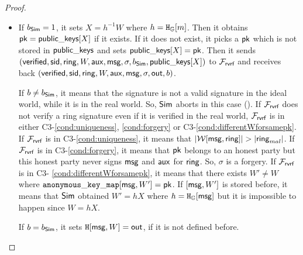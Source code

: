 \begin{proof}
\begin{itemize}
		\begin{itemize}
			\item 		If $ b_{\mathsf{Sim}} = 1 $, it sets $ X = h^{-1} W$ where $ h = \mathtt{H_{\mathbb{G}}}[m] $. Then it obtains $ \mathsf{pk}  = {\mathsf{public\_keys}}[X]$ if it exists. If it does not exist, it picks a $ \mathsf{pk}  $ which is not stored in $ {\mathsf{public\_keys}} $ and sets $ {\mathsf{public\_keys}}[X] = \mathsf{pk} $. Then it sends  $ (\mathsf{verified}, \textsf{sid}, \mathsf{ring}, W,\mathsf{aux},\mathsf{msg}, \sigma, b_{\mathsf{Sim}}, {\mathsf{public\_keys}}[X]) $ to $ \mathcal{F}_{\textsf{rvrf}} $ and receives back $ (\mathsf{verified}, \textsf{sid}, \mathsf{ring}, W, \mathsf{aux}, \mathsf{msg}, \sigma, {\mathsf{out}}, b) $. 
			
			 If $ b \neq b_{\mathsf{Sim}} $, it means that the signature is not a valid signature in the ideal world, while it is in the real world. So, $ \mathsf{Sim} $ aborts in this case ().
				If $ \mathcal{F}_{\textsf{rvrf}} $ does not verify a ring signature even if  it is verified in the real world, $ \mathcal{F}_{\textsf{rvrf}} $ is in either C3-\ref{cond:uniqueness}, \ref{cond:forgery} or C3-\ref{cond:differentWforsamepk}.
				If $ \mathcal{F}_{\textsf{rvrf}} $ is in C3-\ref{cond:uniqueness}, it means that $ |\anonymouskeylist[\msg,\ring]|> |\ring_{mal}| $. If $ \mathcal{F}_{\textsf{rvrf}} $ is in C3-\ref{cond:forgery}, it means that $ \mathsf{pk}$ belongs to an honest party but this honest party never signs $ \mathsf{msg} $ and $ \mathsf{aux} $ for  $ \mathsf{ring} $. So, $ \sigma $ is a forgery.	 If $ \mathcal{F}_{\textsf{rvrf}} $ is in C3- \ref{cond:differentWforsamepk}, it means that there exists $ W' \neq W $ where $ \mathtt{anonymous\_key\_map}[\mathsf{msg},W'] = \mathsf{pk}$. If $ [\mathsf{msg},W'] $ is stored before, it means that $ \mathsf{Sim} $ obtained $ W' = hX $ where $ h =\mathtt{H_{\mathbb{G}}}[\mathsf{msg}] $ but it is impossible to happen since $ W = hX $.
			
				 If $ b = b_{\mathsf{Sim}} $, it sets $\mathtt{H}[\mathsf{msg},W] = {\mathsf{out}} $, if it is not defined before.
				


\end{itemize}
\end{itemize}
\end{proof}
